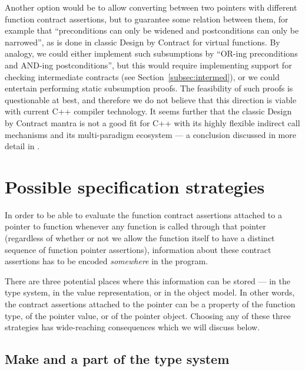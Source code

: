 Another option would be to allow converting between two pointers with different function contract assertions, but to guarantee some relation between them, for example that ``preconditions can only be widened and postconditions can only be narrowed'', as is done in classic Design by Contract for virtual functions. By analogy, we could either implement such subsumptions by ``OR-ing preconditions and AND-ing postconditions'', but this would require implementing support for checking intermediate contracts (see Section~\ref{subsec:intermed}), or we could entertain performing static subsumption proofs. The feasibility of such proofs is questionable at best, and therefore we do not believe that this direction is viable with current C++ compiler technology. It seems further that the classic Design by Contract mantra is not a good fit for C++ with its highly flexible indirect call mechanisms and its multi-paradigm ecosystem --- a conclusion discussed in more detail in \cite{P3097R0}.
\section{Possible specification strategies}
\label{sec:specstrat}

In order to be able to evaluate the function contract assertions attached to a pointer to function whenever any function is called through that pointer (regardless of whether or not we allow the function itself to have a distinct sequence of function pointer assertions), information about these contract assertions has to be encoded \emph{somewhere} in the program.

There are three potential places where this information can be stored --- in the type system, in the value representation, or in the object model. In other words, the contract assertions attached to the pointer can be a property of the function type, of the pointer value, or of the pointer object. Choosing any of these three strategies has wide-reaching consequences which we will discuss below.

\subsection{Make  and  a part of the type system}
\label{subsec:maketype}


